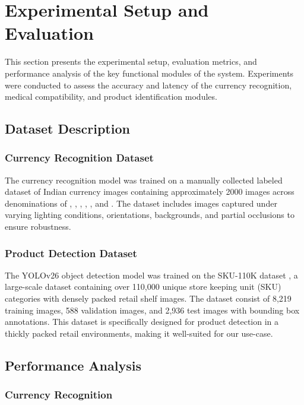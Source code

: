 \documentclass[conference]{IEEEtran}
\begin{document}
\section{Experimental Setup and Evaluation}

This section presents the experimental setup, evaluation metrics, and performance analysis of the key functional modules of the system. Experiments were conducted to assess the accuracy and latency of the currency recognition, medical compatibility, and product identification modules.

\subsection{Dataset Description}


\subsubsection{Currency Recognition Dataset}
The currency recognition model was trained on a manually collected labeled dataset of Indian currency images containing approximately 2000 images across denominations of , , , , , and . The dataset includes images captured under varying lighting conditions, orientations, backgrounds, and partial occlusions to ensure robustness.

\subsubsection{Product Detection Dataset}
The YOLOv26 \cite{b11} object detection model was trained on the SKU-110K dataset \cite{b9}, a large-scale dataset containing over 110,000 unique store keeping unit (SKU) categories with densely packed retail shelf images. The dataset consist of 8,219 training images, 588 validation images, and 2,936 test images with bounding box annotations. This dataset is specifically designed for product detection in a thickly packed retail environments, making it well-suited for our use-case.

\subsection{Performance Analysis}


\subsubsection{Currency Recognition}
\end{document}
